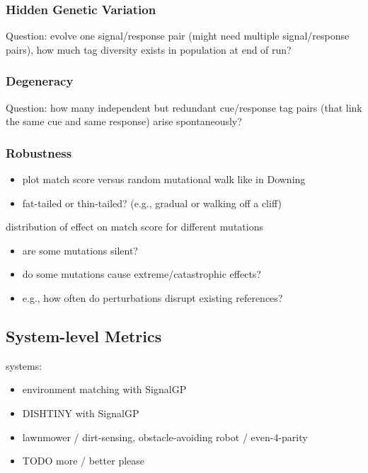\subsubsection{Hidden Genetic Variation}

Question: evolve one signal/response pair (might need multiple signal/response pairs), how much tag diversity exists in population at end of run?

\subsubsection{Degeneracy}

Question: how many independent but redundant cue/response tag pairs (that link the same cue and same response) arise spontaneously?

\subsubsection{Robustness}

\begin{itemize}
\item plot match score versus random mutational walk like in Downing
\item fat-tailed or thin-tailed? (e.g., gradual or walking off a cliff)
\end{itemize}

distribution of effect on match score for different mutations
\begin{itemize}
\item are some mutations silent?
\item do some mutations cause extreme/catastrophic effects?
\item e.g., how often do perturbations disrupt existing references?
\end{itemize}

\subsection{System-level Metrics}

systems:
\begin{itemize}
\item environment matching with SignalGP
\item DISHTINY with SignalGP
\item lawnmower \citep{spector2011tag} / dirt-sensing, obstacle-avoiding robot \citep{spector2011tag} / even-4-parity \citep{spector2012tag}
\item TODO more / better please
\end{itemize}


